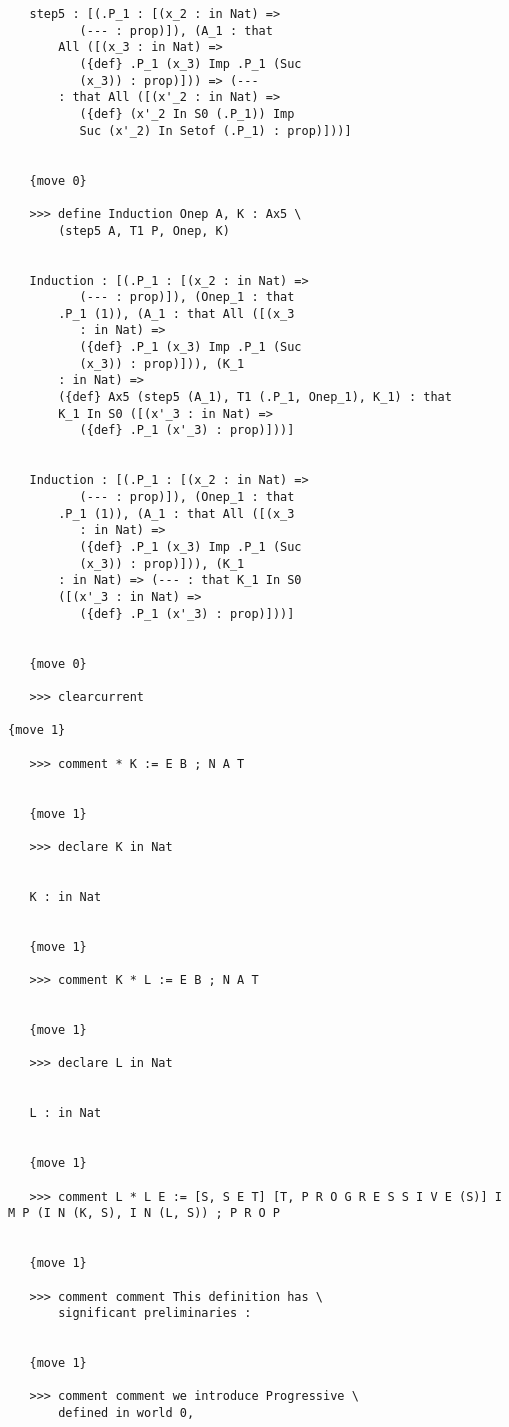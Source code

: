 \documentclass{article}
\begin{document}
\begin{verbatim}
   step5 : [(.P_1 : [(x_2 : in Nat) => 
          (--- : prop)]), (A_1 : that 
       All ([(x_3 : in Nat) => 
          ({def} .P_1 (x_3) Imp .P_1 (Suc 
          (x_3)) : prop)])) => (--- 
       : that All ([(x'_2 : in Nat) => 
          ({def} (x'_2 In S0 (.P_1)) Imp 
          Suc (x'_2) In Setof (.P_1) : prop)]))]


   {move 0}

   >>> define Induction Onep A, K : Ax5 \
       (step5 A, T1 P, Onep, K)


   Induction : [(.P_1 : [(x_2 : in Nat) => 
          (--- : prop)]), (Onep_1 : that 
       .P_1 (1)), (A_1 : that All ([(x_3 
          : in Nat) => 
          ({def} .P_1 (x_3) Imp .P_1 (Suc 
          (x_3)) : prop)])), (K_1 
       : in Nat) => 
       ({def} Ax5 (step5 (A_1), T1 (.P_1, Onep_1), K_1) : that 
       K_1 In S0 ([(x'_3 : in Nat) => 
          ({def} .P_1 (x'_3) : prop)]))]


   Induction : [(.P_1 : [(x_2 : in Nat) => 
          (--- : prop)]), (Onep_1 : that 
       .P_1 (1)), (A_1 : that All ([(x_3 
          : in Nat) => 
          ({def} .P_1 (x_3) Imp .P_1 (Suc 
          (x_3)) : prop)])), (K_1 
       : in Nat) => (--- : that K_1 In S0 
       ([(x'_3 : in Nat) => 
          ({def} .P_1 (x'_3) : prop)]))]


   {move 0}

   >>> clearcurrent

{move 1}

   >>> comment * K := E B ; N A T


   {move 1}

   >>> declare K in Nat


   K : in Nat


   {move 1}

   >>> comment K * L := E B ; N A T


   {move 1}

   >>> declare L in Nat


   L : in Nat


   {move 1}

   >>> comment L * L E := [S, S E T] [T, P R O G R E S S I V E (S)] I M P (I N (K, S), I N (L, S)) ; P R O P


   {move 1}

   >>> comment comment This definition has \
       significant preliminaries :


   {move 1}

   >>> comment comment we introduce Progressive \
       defined in world 0,



\end{verbatim}
\end{document}
